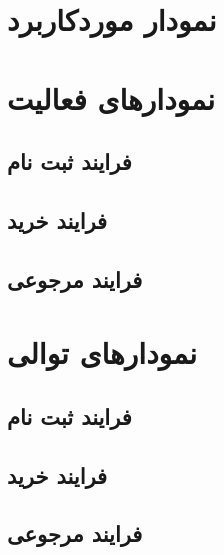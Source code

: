 \documentclass[12pt,a4paper]{article}
\begin{document}
\maketitle
\pagebreak
\tableofcontents
\pagebreak
\normalsize	

\section{نمودار موردکاربرد} \label{section.useCase}


\section{نمودارهای فعالیت} \label{section.activity}


\subsection{فرایند ثبت نام} \label{section.activity.register}


\subsection{فرایند خرید} \label{section.activity.buy}


\subsection{فرایند مرجوعی} \label{section.activity.return}


\section{نمودارهای توالی} \label{section.sequence}


\subsection{فرایند ثبت نام} \label{section.sequence.register}


\subsection{فرایند خرید} \label{section.sequence.buy}


\subsection{فرایند مرجوعی} \label{section.sequence.return}
\end{document}
